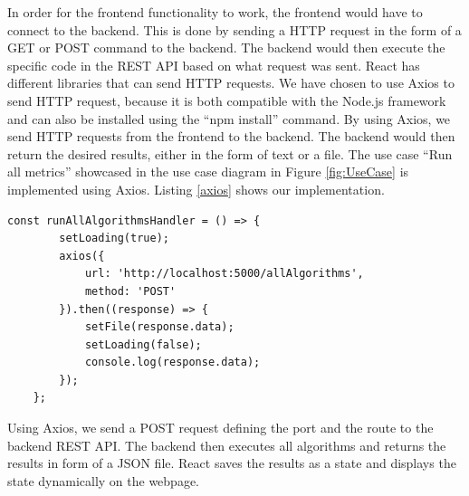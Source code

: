 In order for the frontend functionality to work, the frontend would have to connect to the backend. This is done by sending a HTTP request in the form of a GET or POST command to the backend. The backend would then execute the specific code in the REST API based on what request was sent. React has different libraries that can send HTTP requests. We have chosen to use Axios to send HTTP request, because it is both compatible with the Node.js framework and can also be installed using the ``npm install'' command. By using Axios, we send HTTP requests from the frontend to the backend. The backend would then return the desired results, either in the form of text or a file. The use case ``Run all metrics'' showcased in the use case diagram in Figure \ref{fig:UseCase} is implemented using Axios.  
Listing \ref{axios} shows our implementation. 
%
\begin{lstlisting}[style={htmlcssjs},caption={Axios HTTP request implementation},label={axios}]
const runAllAlgorithmsHandler = () => {
		setLoading(true);
		axios({
			url: 'http://localhost:5000/allAlgorithms',
			method: 'POST'
		}).then((response) => {
			setFile(response.data);
			setLoading(false);
			console.log(response.data);
		});
	};
\end{lstlisting}
%
Using Axios, we send a POST request defining the port and the route to the backend REST API. The backend then executes all algorithms and returns the results in form of a JSON file. React saves the results as a state and displays the state dynamically on the webpage. 




